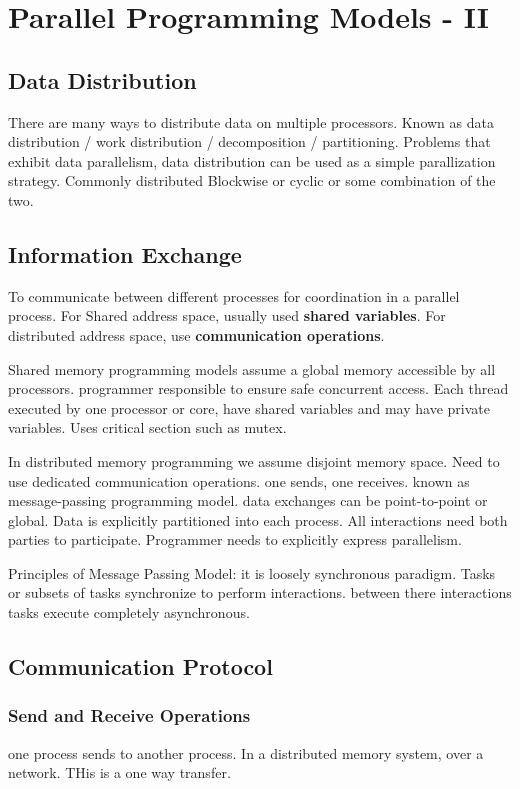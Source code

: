 \documentclass{article}
\begin{document}
\section{Parallel Programming Models - II}
\subsection{Data Distribution}
There are many ways to distribute data on multiple processors.
Known as data distribution / work distribution / decomposition / partitioning.
Problems that exhibit data parallelism, data distribution can be used as a simple parallization strategy.
Commonly distributed Blockwise or cyclic or some combination of the two.

\subsection{Information Exchange}
To communicate between different processes for coordination in a parallel process.
For Shared address space, usually used \textbf{shared variables}.
For distributed address space, use \textbf{communication operations}.

Shared memory programming models assume a global memory accessible by all processors.
programmer responsible to ensure safe concurrent access.
Each thread executed by one processor or core, have shared variables and may have private variables.
Uses critical section such as mutex.

In distributed memory programming we assume disjoint memory space.
Need to use dedicated communication operations.
one sends, one receives. known as message-passing programming model.
data exchanges can be point-to-point or global.
Data is explicitly partitioned into each process.
All interactions need both parties to participate.
Programmer needs to explicitly express parallelism.

Principles of Message Passing Model:
it is loosely synchronous paradigm.
Tasks or subsets of tasks synchronize to perform interactions.
between there interactions tasks execute completely asynchronous.

\subsection{Communication Protocol}
\subsubsection{Send and Receive Operations}
one process sends to another process.
In a distributed memory system, over a network. THis is a one way transfer.
\end{document}
